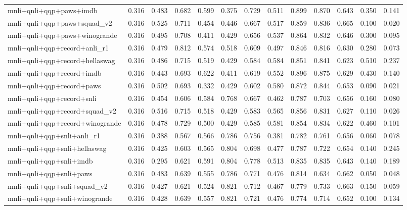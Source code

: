 \begin{table}[t]
\begin{tabular}{lrrrrrrrrrrrr}
    mnli+qnli+qqp+paws+imdb & 0.316 & 0.483 & 0.682 & 0.599 & 0.375 & 0.729 & 0.511 & 0.899 & 0.870 & 0.643 & 0.350 & 0.141 \\
    mnli+qnli+qqp+paws+squad\_v2 & 0.316 & 0.525 & 0.711 & 0.454 & 0.446 & 0.667 & 0.517 & 0.859 & 0.836 & 0.665 & 0.100 & 0.020 \\
    mnli+qnli+qqp+paws+winogrande & 0.316 & 0.495 & 0.708 & 0.411 & 0.429 & 0.656 & 0.537 & 0.864 & 0.832 & 0.646 & 0.300 & 0.095 \\
    mnli+qnli+qqp+record+anli\_r1 & 0.316 & 0.479 & 0.812 & 0.574 & 0.518 & 0.609 & 0.497 & 0.846 & 0.816 & 0.630 & 0.280 & 0.073 \\
    mnli+qnli+qqp+record+hellaswag & 0.316 & 0.486 & 0.715 & 0.519 & 0.429 & 0.584 & 0.584 & 0.851 & 0.841 & 0.623 & 0.510 & 0.237 \\
    mnli+qnli+qqp+record+imdb & 0.316 & 0.443 & 0.693 & 0.622 & 0.411 & 0.619 & 0.552 & 0.896 & 0.875 & 0.629 & 0.430 & 0.140 \\
    mnli+qnli+qqp+record+paws & 0.316 & 0.502 & 0.693 & 0.332 & 0.429 & 0.602 & 0.580 & 0.872 & 0.844 & 0.653 & 0.090 & 0.021 \\
    mnli+qnli+qqp+record+snli & 0.316 & 0.454 & 0.606 & 0.584 & 0.768 & 0.667 & 0.462 & 0.787 & 0.703 & 0.656 & 0.160 & 0.080 \\
    mnli+qnli+qqp+record+squad\_v2 & 0.316 & 0.516 & 0.715 & 0.518 & 0.429 & 0.583 & 0.565 & 0.856 & 0.831 & 0.627 & 0.110 & 0.026 \\
    mnli+qnli+qqp+record+winogrande & 0.316 & 0.478 & 0.729 & 0.500 & 0.429 & 0.585 & 0.581 & 0.854 & 0.834 & 0.622 & 0.460 & 0.101 \\
    mnli+qnli+qqp+snli+anli\_r1 & 0.316 & 0.388 & 0.567 & 0.566 & 0.786 & 0.756 & 0.381 & 0.782 & 0.761 & 0.656 & 0.060 & 0.078 \\
    mnli+qnli+qqp+snli+hellaswag & 0.316 & 0.425 & 0.603 & 0.565 & 0.804 & 0.698 & 0.477 & 0.787 & 0.722 & 0.654 & 0.140 & 0.245 \\
    mnli+qnli+qqp+snli+imdb & 0.316 & 0.295 & 0.621 & 0.591 & 0.804 & 0.778 & 0.513 & 0.835 & 0.835 & 0.643 & 0.140 & 0.189 \\
    mnli+qnli+qqp+snli+paws & 0.316 & 0.483 & 0.639 & 0.555 & 0.786 & 0.771 & 0.476 & 0.814 & 0.634 & 0.662 & 0.050 & 0.048 \\
    mnli+qnli+qqp+snli+squad\_v2 & 0.316 & 0.427 & 0.621 & 0.524 & 0.821 & 0.712 & 0.467 & 0.779 & 0.733 & 0.663 & 0.150 & 0.059 \\
    mnli+qnli+qqp+snli+winogrande & 0.316 & 0.428 & 0.639 & 0.557 & 0.821 & 0.721 & 0.476 & 0.774 & 0.714 & 0.652 & 0.100 & 0.134 \\

\end{tabular}
\end{table}
